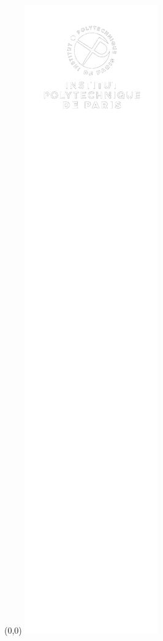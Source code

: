 \thispagestyle{empty}

\color{black} \hfill \vfill \tiny \ecodocnum
\begin{textblock}{5}(0,0)
	\includegraphics [scale=0.95]{media/bandetransp2.png}
	\vspace{300mm}
\end{textblock}


